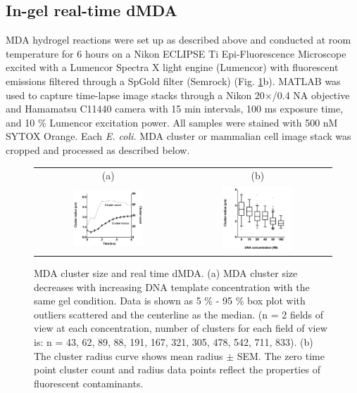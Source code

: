 \subsection{In-gel real-time dMDA}
MDA hydrogel reactions were set up as described above and conducted at room temperature for 6 hours on a Nikon ECLIPSE Ti Epi-Fluorescence Microscope excited with a Lumencor Spectra X light engine (Lumencor) with fluorescent emissions filtered through a SpGold filter (Semrock) (Fig. \ref{fig:dMDA_Quant}b). MATLAB was used to capture time-lapse image stacks through a Nikon 20$\times$\slash 0.4 NA objective and Hamamatsu C11440 camera with 15 min intervals, 100 ms exposure time, and 10 \% Lumencor excitation power. All samples were stained with 500 nM SYTOX Orange. Each \textit{E. coli.} MDA cluster or mammalian cell image stack was cropped and processed as described below.

\begin{figure}
\begin{tabular}{cc}
(a) & (b) \\
\includegraphics[keepaspectratio,width=0.5\textwidth]{./figures/SuppFig1.jpg} &  \includegraphics[keepaspectratio,width=0.5\textwidth]{./figures/SuppFig4.jpg} \\
\end{tabular}
\caption[MDA cluster size and real time dMDA.]{MDA cluster size and real time dMDA. (a) MDA cluster size decreases with increasing DNA template concentration with the same gel condition. Data is shown as 5 \% - 95 \% box plot with outliers scattered and the centerline as the median. (n = 2 fields of view at each concentration, number of clusters for each field of view is: n = 43, 62, 89, 88, 191, 167, 321, 305, 478, 542, 711, 833). (b) The cluster radius curve shows mean radius $\pm$ SEM. The zero time point cluster count and radius data points reflect the properties of fluorescent contaminants.}
\label{fig:dMDA_Quant}
\end{figure}

